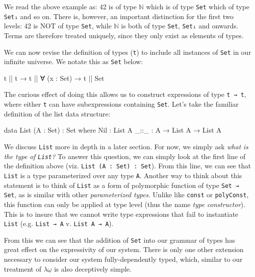 \documentclass[12pt]{article}
\begin{document}
We read the above example as: 42 is of type \(\mathbb{N}\) which is of type
{\tt Set} which of type {\tt Set₁} and so on. There is, however, an important
distinction for the first two levels: 42 is NOT of type {\tt Set}, while
\(\mathbb{N}\) is both of type {\tt Set}, {\tt Set₁} and onwards. Terms are
therefore treated uniquely, since they only exist as elements of types.

We can now revise the definition of types ({\tt t}) to include all instances of
{\tt Set} in our infinite universe. We notate this as {\tt Set} below:

\begin{center}
\begin{minipage}{0.65\textwidth}
\begin{code}
t || t → t || ∀ (x : Set) → t || Set
\end{code}
\end{minipage}
\end{center}

The curious effect of doing this allows us to construct expressions of type
{\tt t → t}, where either {\tt t} can have subexpressions containing {\tt Set}.
Let's take the familiar definition of the list data structure:

\begin{center}
\begin{minipage}{0.65\textwidth}
\begin{code}
data List (A : Set) : Set where
  Nil  : List A
  _::_ : A → List A → List A
\end{code}
\end{minipage}
\end{center}

We discuss {\tt List} more in depth in a later section. For now, we simply ask
{\em what is the type of {\tt List}?} To answer this question, we can simply
look at the first line of the definition above (viz. {\tt List (A : Set) : Set}).
From this line, we can see that {\tt List} is a type parameterized over any type
{\tt A}. Another way to think about this statement is to think of {\tt List} as
a form of polymorphic function of type {\tt Set → Set}, as is similar with other
{\em parameterized types}. Unlike like {\tt const} or {\tt polyConst}, this
function can only be applied at type level (thus the name {\em type constructor}).
This is to insure that we cannot write type expressions that fail to instantiate
{\tt List} (e.g. {\tt List → A} v. {\tt List A → A}).

From this we can see that the addition of {\tt Set} into our grammar of
types has great effect on the expressivity of our system. There is only one
other extension necessary to consider our system fully-dependently typed, which,
similar to our treatment of \(\lambda\underline{\omega}\) is also deceptively
simple.
\end{document}
